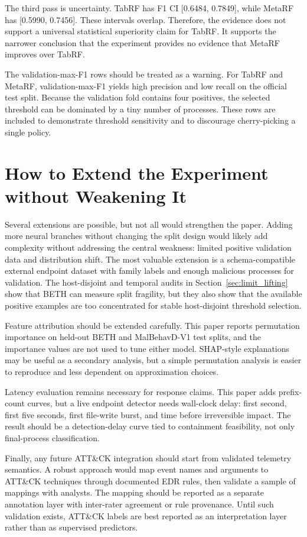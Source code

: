 \documentclass[journal]{IEEEtran}
\begin{document}
The third pass is uncertainty. TabRF has F1 CI [0.6484, 0.7849], while MetaRF has [0.5990, 0.7456]. These intervals overlap. Therefore, the evidence does not support a universal statistical superiority claim for TabRF. It supports the narrower conclusion that the experiment provides no evidence that MetaRF improves over TabRF.

The validation-max-F1 rows should be treated as a warning. For TabRF and MetaRF, validation-max-F1 yields high precision and low recall on the official test split. Because the validation fold contains four positives, the selected threshold can be dominated by a tiny number of processes. These rows are included to demonstrate threshold sensitivity and to discourage cherry-picking a single policy.

\section{How to Extend the Experiment without Weakening It}
\label{app:extensions}

Several extensions are possible, but not all would strengthen the paper. Adding more neural branches without changing the split design would likely add complexity without addressing the central weakness: limited positive validation data and distribution shift. The most valuable extension is a schema-compatible external endpoint dataset with family labels and enough malicious processes for validation. The host-disjoint and temporal audits in Section~\ref{sec:limit_lifting} show that BETH can measure split fragility, but they also show that the available positive examples are too concentrated for stable host-disjoint threshold selection.

Feature attribution should be extended carefully. This paper reports permutation importance on held-out BETH and MalBehavD-V1 test splits, and the importance values are not used to tune either model. SHAP-style explanations may be useful as a secondary analysis, but a simple permutation analysis is easier to reproduce and less dependent on approximation choices.

Latency evaluation remains necessary for response claims. This paper adds prefix-count curves, but a live endpoint detector needs wall-clock delay: first second, first five seconds, first file-write burst, and time before irreversible impact. The result should be a detection-delay curve tied to containment feasibility, not only final-process classification.

Finally, any future ATT\&CK integration should start from validated telemetry semantics. A robust approach would map event names and arguments to ATT\&CK techniques through documented EDR rules, then validate a sample of mappings with analysts. The mapping should be reported as a separate annotation layer with inter-rater agreement or rule provenance. Until such validation exists, ATT\&CK labels are best reported as an interpretation layer rather than as supervised predictors.
\end{document}
